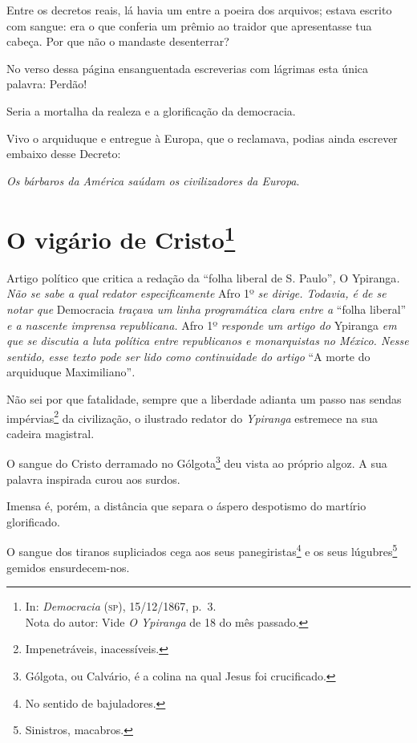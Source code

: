 Entre os decretos reais, lá havia um entre a poeira dos arquivos; estava
escrito com sangue: era o que conferia um prêmio ao traidor que
apresentasse tua cabeça. Por que não o mandaste desenterrar?

No verso dessa página ensanguentada escreverias com lágrimas esta única
palavra: Perdão!

Seria a mortalha da realeza e a glorificação da democracia.

Vivo o arquiduque e entregue à Europa, que o reclamava, podias ainda
escrever embaixo desse Decreto:

\emph{Os bárbaros da América saúdam os civilizadores da Europa}.

\chapter{O vigário de Cristo\footnote{In: \emph{Democracia} (\textsc{sp}),
  15/12/1867, p.~3.\\
  Nota do autor: Vide \emph{O Ypiranga} de 18 do mês passado.}}

\begin{didascalia}
Artigo político que critica a redação da ``folha liberal de S.
Paulo''\emph{,} O Ypiranga\emph{. Não se sabe a qual redator
especificamente} Afro 1º \emph{se dirige. Todavia, é de se notar que}
Democracia \emph{traçava um linha programática clara entre a} ``folha
liberal'' \emph{e a nascente imprensa republicana.} Afro 1º
\emph{responde um artigo do} Ypiranga \emph{em que se discutia a luta
política entre republicanos e monarquistas no México. Nesse sentido,
esse texto pode ser lido como continuidade do artigo} ``A morte do
arquiduque Maximiliano''\emph{.}
\end{didascalia}



Não sei por que fatalidade, sempre que a liberdade adianta um passo nas
sendas impérvias\footnote{Impenetráveis, inacessíveis.} da
civilização, o ilustrado redator do \emph{Ypiranga} estremece na sua
cadeira magistral.

O sangue do Cristo derramado no Gólgota\footnote{Gólgota, ou Calvário,
  é a colina na qual Jesus foi crucificado.} deu vista ao próprio algoz.
A sua palavra inspirada curou aos surdos.

Imensa é, porém, a distância que separa o áspero despotismo do martírio
glorificado.

O sangue dos tiranos supliciados cega aos seus panegiristas\footnote{
  No sentido de bajuladores.} e os seus lúgubres\footnote{Sinistros,
  macabros.} gemidos ensurdecem-nos.


